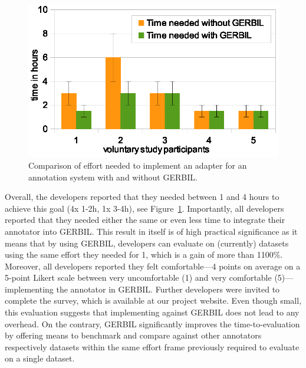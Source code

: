 \begin{figure}[tb!]
\centering
\includegraphics[width=\columnwidth]{part_02/benchmarking/WWW_GERBIL/user_study.eps}
\caption{Comparison of effort needed to implement an adapter for an annotation system with and without GERBIL.}
\label{ref:comparedTime}
\end{figure}
%

Overall, the developers reported that they needed between 1 and 4 hours to achieve this goal (4x 1-2h, 1x 3-4h), see Figure~\ref{ref:comparedTime}.
Importantly, all developers reported that they needed either the same or even less time to integrate their annotator into GERBIL.
This result in itself is of high practical significance as it means that by using GERBIL, developers can evaluate on (currently) \overalldatasets datasets using the same effort they needed for 1, which is a gain of more than 1100\%.
Moreover, all developers reported they felt comfortable---4 points on average on a 5-point Likert scale between very uncomfortable (1) and very comfortable (5)---implementing the annotator in GERBIL.
Further developers were invited to complete the survey, which is available at our project website.
Even though small, this evaluation suggests that implementing against GERBIL does not lead to any overhead. On the contrary, GERBIL significantly improves the time-to-evaluation by offering means to benchmark and compare against other annotators respectively datasets within the same effort frame previously required to evaluate on a single dataset.

